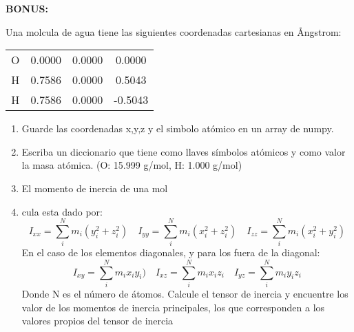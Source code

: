 \documentclass[5pt]{exam}
\begin{document}
{\begin{questions}
    \vspace{1cm}
    \LARGE{\textbf{BONUS:}}
    \vspace{1cm}

\item Una molcula de agua tiene las siguientes coordenadas cartesianas en \AA ngstrom: 
    \begin{table}[h!]
        \centering
        \begin{tabular}{c|ccc}
            O & 0.0000 & 0.0000 & 0.0000 \\
            H & 0.7586 & 0.0000 & 0.5043 \\
            H & 0.7586 & 0.0000 & -0.5043
        \end{tabular}
    \end{table}
    \begin{enumerate}
        \item Guarde las coordenadas x,y,z y el simbolo atómico en un array de numpy.
        \item Escriba un diccionario que tiene como llaves símbolos atómicos y como valor la masa
              atómica. (O: 15.999 g/mol, H: 1.000 g/mol)
        \item El momento de inercia de una mol\item cula esta dado por:
            \begin{equation}
                I_{xx} = \sum_i^N m_i(y_i^2 + z_i^2) \quad I_{yy} = \sum_i^N m_i(x_i^2 + z_i^2) \quad I_{zz} = \sum_i^N m_i(x_i^2 + y_i^2)
            \end{equation}
        En el caso de los elementos diagonales, y para los fuera de la diagonal:
            \begin{equation}
                I_{xy} = \sum_i^N m_ix_iy_i) \quad I_{xz} = \sum_i^N m_ix_iz_i \quad I_{yz}=\sum_i^N m_iy_iz_i
            \end{equation}
        Donde N es el número de átomos. Calcule el tensor de inercia y encuentre los valor de los
        momentos de inercia principales, los que corresponden a los valores propios del tensor de
        inercia
    \end{enumerate}


\end{questions}}
\end{document}
